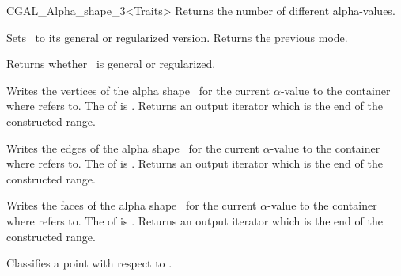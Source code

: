 \begin{ccClassTemplate} {CGAL_Alpha_shape_3<Traits>}
{Returns the number of different alpha-values.}

% 
% 
% 

{Sets \ccVar\ to its general or regularized version. 
Returns the previous mode.}

{Returns whether \ccVar\ is general or regularized.}

{Writes the vertices of the alpha shape \ccVar\ for the current $\alpha$-value
to the container where  refers to. 
The  of  is .
Returns an output iterator which is the end of the constructed range.}

{Writes the edges  of the alpha shape \ccVar\ for the current $\alpha$-value
to the container where  refers to. 
The  of  is 
.
Returns an output iterator which is the end of the constructed range.}

{Writes the faces 
of the alpha shape \ccVar\ for the current $\alpha$-value
to the container where  refers to. 
The  of  is .
Returns an output iterator which is the end of the constructed range.}


{Classifies a point  with respect to \ccVar.}


\end{ccClassTemplate}

